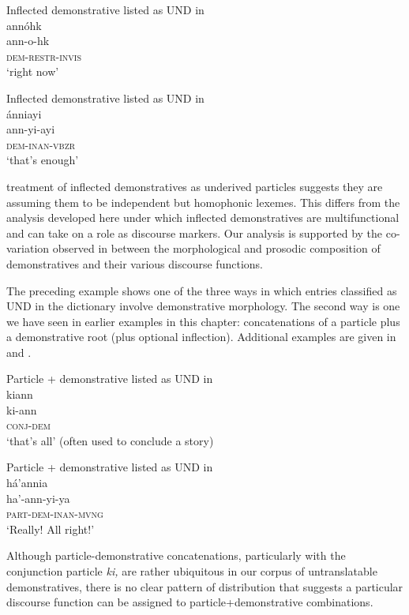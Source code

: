 \documentclass[output=paper,colorlinks,citecolor=brown]{langscibook}
\begin{document}
\ea\label{ex:bliss:24} {Inflected demonstrative listed as UND in \citet{FrantzRussell1995}}\\
annóhk\\
\gll ann-o-hk\\
     \textsc{dem-restr-invis}\\
\glt ‘right now’
\z

\ea\label{ex:bliss:25} {Inflected demonstrative listed as UND in \citet{FrantzRussell1995}}\\
ánniayi\\
\gll ann-yi-ayi\\
     \textsc{dem-inan-vbzr}\\
\glt ‘that’s enough’
\z

 treatment of inflected demonstratives as underived particles suggests they are assuming them to be independent but homophonic lexemes. This differs from the analysis developed here under which inflected demonstratives are multifunctional and can take on a role as discourse markers. Our analysis is supported by the co-variation observed in  between the morphological and prosodic composition of demonstratives and their various discourse functions.

The preceding example shows one of the three ways in which entries classified as UND in the dictionary involve demonstrative morphology. The second way is one we have seen in earlier examples in this chapter: concatenations of a particle plus a demonstrative root (plus optional inflection). Additional examples are given in  and .

\ea\label{ex:bliss:26} {Particle + demonstrative listed as UND in \citet{FrantzRussell1995}}\\
kiann\\
\gll ki-ann\footnotemark{}\\
     \textsc{conj-dem}\\
\glt ‘that’s all’   (often used to conclude a story)
\z
{}

\ea\label{ex:bliss:27} {Particle + demonstrative listed as UND in \citet{FrantzRussell1995}}\\
há’annia\\
\gll ha’-ann-yi-ya\\
     \textsc{part-dem-inan-mvng}\\
\glt ‘Really! All right!’
\z

Although particle-demonstrative concatenations, particularly with the conjunction particle \textit{ki,} are rather ubiquitous in our corpus of untranslatable demonstratives, there is no clear pattern of distribution that suggests a particular discourse function can be assigned to particle+demonstrative combinations. 
\end{document}
